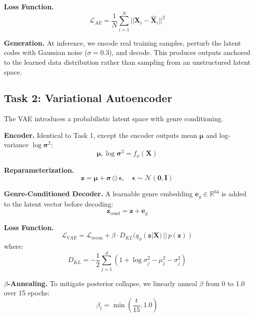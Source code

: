 \documentclass[conference]{IEEEtran}
\begin{document}
\textbf{Loss Function.}
\begin{equation}
    \mathcal{L}_{AE} = \frac{1}{N}\sum_{i=1}^{N} ||\mathbf{X}_i - \hat{\mathbf{X}}_i||^2
\end{equation}

\textbf{Generation.} At inference, we encode real training samples, perturb the latent codes with Gaussian noise ($\sigma = 0.3$), and decode. This produces outputs anchored to the learned data distribution rather than sampling from an unstructured latent space.

\subsection{Task 2: Variational Autoencoder}

The VAE introduces a probabilistic latent space with genre conditioning.

\textbf{Encoder.} Identical to Task 1, except the encoder outputs mean $\boldsymbol{\mu}$ and log-variance $\log \boldsymbol{\sigma}^2$:
\begin{equation}
    \boldsymbol{\mu}, \log \boldsymbol{\sigma}^2 = f_\phi(\mathbf{X})
\end{equation}

\textbf{Reparameterization.}
\begin{equation}
    \mathbf{z} = \boldsymbol{\mu} + \boldsymbol{\sigma} \odot \boldsymbol{\epsilon}, \quad \boldsymbol{\epsilon} \sim \mathcal{N}(\mathbf{0}, \mathbf{I})
\end{equation}

\textbf{Genre-Conditioned Decoder.} A learnable genre embedding $\mathbf{e}_g \in \mathbb{R}^{64}$ is added to the latent vector before decoding:
\begin{equation}
    \mathbf{z}_{\text{cond}} = \mathbf{z} + \mathbf{e}_g
\end{equation}

\textbf{Loss Function.}
\begin{equation}
    \mathcal{L}_{VAE} = \mathcal{L}_{\text{recon}} + \beta \cdot D_{KL}(q_\phi(\mathbf{z}|\mathbf{X}) \,||\, p(\mathbf{z}))
\end{equation}
where:
\begin{equation}
    D_{KL} = -\frac{1}{2}\sum_{j=1}^{d}\left(1 + \log \sigma_j^2 - \mu_j^2 - \sigma_j^2\right)
\end{equation}

\textbf{$\beta$-Annealing.} To mitigate posterior collapse, we linearly anneal $\beta$ from 0 to 1.0 over 15 epochs:
\begin{equation}
    \beta_t = \min\left(\frac{t}{15}, 1.0\right)
\end{equation}
\end{document}
